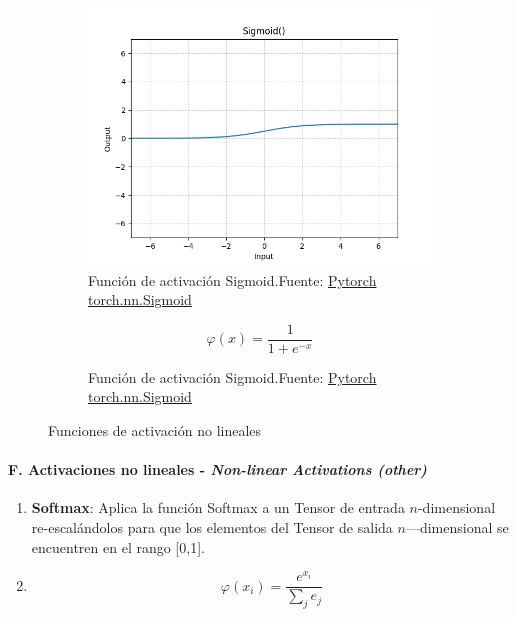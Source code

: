 \begin{figure}[H]
    \medskip
    \begin{subfigure}{.475\linewidth}
        \centering
        \includegraphics[width=0.75\linewidth]{figures/equations/Sigmoid.png}
        \caption{Función de activación Sigmoid.\newline{}Fuente: \href{https://pytorch.org/docs/stable/generated/torch.nn.Sigmoid.html}{Pytorch torch.nn.Sigmoid}}
        \label{subfig:torch.nn.Sigmoid}
    \end{subfigure}\hfill
    \begin{subfigure}{.475\linewidth}
        \centering
        \begin{equation*} \varphi(x) = \frac{1}{1+e^{-x}} \end{equation*}
        \caption{Función de activación Sigmoid.\newline{}Fuente: \href{https://pytorch.org/docs/stable/generated/torch.nn.Sigmoid.html}{Pytorch torch.nn.Sigmoid}}
        \label{subfig:eq-torch.nn.Sigmoid}
    \end{subfigure}

    \caption{Funciones de activación no lineales}
    \label{fig:p2--equations--Non-linear-Activations}
\end{figure}


\paragraph*{F. Activaciones no lineales - \textit{Non-linear Activations (other)} \cite{pytorch2024github}}

\begin{enumerate}
    \item \textbf{Softmax}: Aplica la función Softmax a un Tensor de entrada ${n}$-dimensional re-escalándolos para que los elementos del Tensor de salida ${n}$—dimensional se encuentren en el rango [0,1]. \cite{pytorch2024github}
    \item[] \begin{equation} \varphi(x_{i}) = \frac{e^{x_{i}}}{\sum_{j}{e_{j}}} \end{equation}
\end{enumerate}


